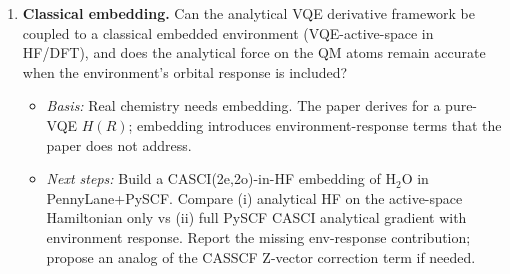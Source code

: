 \begin{enumerate}
\item \textbf{Classical embedding.} Can the analytical VQE derivative framework be coupled to a
classical embedded environment (VQE-active-space in HF/DFT), and does the analytical force on the
QM atoms remain accurate when the environment's orbital response is included?
\begin{itemize}
\item \emph{Basis:} Real chemistry needs embedding. The paper derives for a pure-VQE $H(R)$;
embedding introduces environment-response terms that the paper does not address.
\item \emph{Next steps:} Build a CASCI(2e,2o)-in-HF embedding of H$_2$O in PennyLane+PySCF. Compare
(i) analytical HF on the active-space Hamiltonian only vs (ii) full PySCF CASCI analytical gradient
with environment response. Report the missing env-response contribution; propose an analog of the
CASSCF Z-vector correction term if needed.
\end{itemize}
\end{enumerate}

